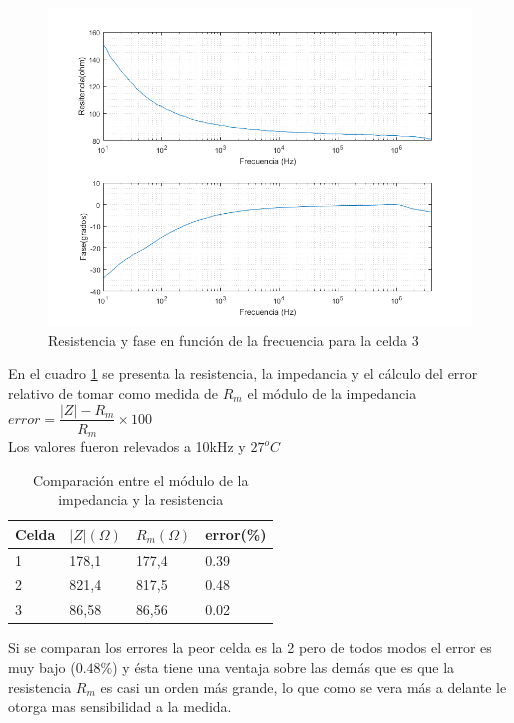 \begin{figure}[H]
\centering
\includegraphics[width=1\textwidth]{Celda/celda_3.png}
\caption{Resistencia y fase en función de la frecuencia para la celda 3}
\label{fig:celda_3}
\end{figure}

En el cuadro \ref{tabla:celdas_error} se presenta la resistencia, la impedancia y el cálculo del error relativo de tomar como medida de $R_{m}$ el módulo de la impedancia $error=\dfrac{|Z|-R_{m}}{R_{m}}\times 100$ \\
Los valores fueron relevados a 10kHz y $27^{o}C$
\begin{table}[htp]
\centering
\caption{Comparación entre el módulo de la impedancia y la resistencia}
\label{tabla:celda_error}

\begin{tabular}{|l|l|l|l|}
	\hline
	Celda &$|Z|(\Omega)$& $R_{m}(\Omega)$& error(\%)  \\ \hline
	1 & 178,1& 177,4 & 0.39\\ \hline
    2 & 821,4 & 817,5 & 0.48\\ \hline
    3 & 86,58  & 86,56 & 0.02\\ \hline
 
\end{tabular}
\label{tabla:celdas_error}
\end{table}

Si se comparan los errores la peor celda es la 2 pero de todos modos el error es muy bajo ($0.48\%$) y ésta tiene una ventaja sobre las demás que es que la resistencia $R_{m}$ es casi un orden más grande, lo que como se vera más a delante le otorga mas sensibilidad a la medida.\\

